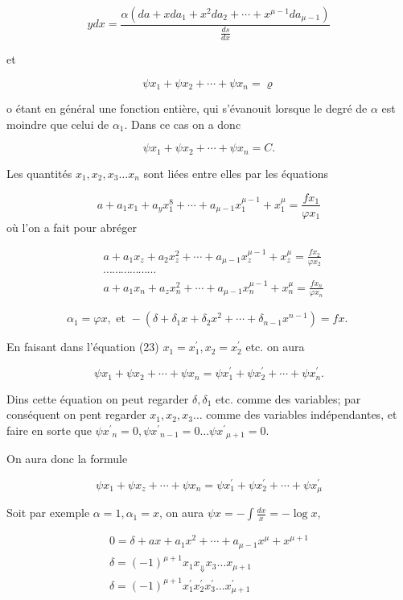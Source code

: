 \documentclass{article}
\begin{document}
\[
y d x=\frac{\alpha\left(d a+x d a_{1}+x^{2} d a_{2}+\cdots+x^{\mu-1} d a_{\mu-1}\right)}{\frac{d s}{d x}}
\]

et

\[
\psi x_{1}+\psi x_{2}+\cdots+\psi x_{n}=\varrho
\]

o étant en général une fonction entière, qui s'évanouit lorsque le degré de \(\alpha\) est moindre que celui de \(\alpha_{1}\). Dans ce cas on a donc

\[
\psi x_{1}+\psi x_{2}+\cdots+\psi x_{n}=C .
\]

Les quantités \(x_{1}, x_{2}, x_{3} \ldots x_{n}\) sont liées entre elles par les équations

\[
a+a_{1} x_{1}+a_{y} x_{1}^{8}+\cdots+a_{\mu-1} x_{1}^{\mu-1}+x_{1}^{\mu}=\frac{f x_{1}}{\varphi x_{1}}
\]
où l'on a fait pour abréger

\[
\begin{aligned}
& a+a_{1} x_{z}+a_{2} x_{z}^{2}+\cdots+a_{\mu-1} x_{z}^{\mu-1}+x_{z}^{\mu}=\frac{f x_{2}}{\varphi x_{2}} \\
& \cdots \cdots \cdots \cdots \cdots \cdots \\
& a+a_{1} x_{n}+a_{z} x_{n}^{2}+\cdots+a_{\mu-1} x_{n}^{\mu-1}+x_{n}^{\mu}=\frac{f x_{n}}{\varphi x_{n}}
\end{aligned}
\]

\[
\alpha_{1}=\varphi x, \text { et }-\left(\delta+\delta_{1} x+\delta_{2} x^{2}+\cdots+\delta_{n-1} x^{n-1}\right)=f x \text {. }
\]

En faisant dans l'équation (23) \(x_{1}=x_{1}^{\prime}, x_{2}=x_{2}^{\prime}\) etc. on aura

\[
\psi x_{1}+\psi x_{2}+\cdots+\psi x_{n}=\psi x_{1}^{\prime}+\psi x_{2}^{\prime}+\cdots+\psi x_{n}^{\prime} .
\]

Dins cette équation on peut regarder \(\delta, \delta_{1}\) etc. comme des variables; par conséquent on pent regarder \(x_{1}, x_{2}, x_{3} \ldots\) comme des variables indépendantes, et faire en sorte que \(\psi x^{\prime}{ }_{n}=0, \psi x^{\prime}{ }_{n-1}=0 \ldots \psi x^{\prime}{ }_{\mu+1}=0\).

On aura donc la formule

\[
\psi x_{1}+\psi x_{z}+\cdots+\psi x_{n}=\psi x_{1}^{\prime}+\psi x_{2}^{\prime}+\cdots+\psi x_{\mu}^{\prime}
\]

Soit par exemple \(\alpha=1, \alpha_{1}=x\), on aura \(\psi x=-\int \frac{d x}{x}=-\log x\),

\[
\begin{gathered}
0=\delta+a x+a_{1} x^{2}+\cdots+a_{\mu-1} x^{\mu}+x^{\mu+1} \\
\delta=(-1)^{\mu+1} x_{1} x_{\Downarrow} x_{3} \ldots x_{\mu+1} \\
\delta=(-1)^{\mu+1} x_{1}^{\prime} x_{2}^{\prime} x_{3}^{\prime} \ldots x_{\mu+1}^{\prime}
\end{gathered}
\]
\end{document}
